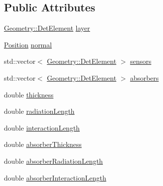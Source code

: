 \subsection*{Public Attributes}
\begin{DoxyCompactItemize}
\item 
\hyperlink{class_d_d4hep_1_1_geometry_1_1_det_element}{Geometry\+::\+Det\+Element} \hyperlink{struct_d_d4hep_1_1_d_d_rec_1_1_layering_extension_impl_1_1_layer_attributes_af0bbd3d9f7b9b1297b6cc79deaf05147}{layer}
\item 
\hyperlink{class_d_d4hep_1_1_d_d_rec_1_1_layering_extension_impl_a34281f7585bbe0d61654c9924e2789e3}{Position} \hyperlink{struct_d_d4hep_1_1_d_d_rec_1_1_layering_extension_impl_1_1_layer_attributes_a9920dfca99a6c4fc644a03ad650d1ffb}{normal}
\item 
std\+::vector$<$ \hyperlink{class_d_d4hep_1_1_geometry_1_1_det_element}{Geometry\+::\+Det\+Element} $>$ \hyperlink{struct_d_d4hep_1_1_d_d_rec_1_1_layering_extension_impl_1_1_layer_attributes_ae2f7cbcf5fd427fc4655bf769003909a}{sensors}
\item 
std\+::vector$<$ \hyperlink{class_d_d4hep_1_1_geometry_1_1_det_element}{Geometry\+::\+Det\+Element} $>$ \hyperlink{struct_d_d4hep_1_1_d_d_rec_1_1_layering_extension_impl_1_1_layer_attributes_a36c95a802bff564fab44f6c0cfdfbda3}{absorbers}
\item 
double \hyperlink{struct_d_d4hep_1_1_d_d_rec_1_1_layering_extension_impl_1_1_layer_attributes_a5c913b79fd8fba9c943fc7b10097663b}{thickness}
\item 
double \hyperlink{struct_d_d4hep_1_1_d_d_rec_1_1_layering_extension_impl_1_1_layer_attributes_ac5d8747f913962efd864c527e5f58e5b}{radiation\+Length}
\item 
double \hyperlink{struct_d_d4hep_1_1_d_d_rec_1_1_layering_extension_impl_1_1_layer_attributes_a8be7b3707f08f24e5738568783a67f7e}{interaction\+Length}
\item 
double \hyperlink{struct_d_d4hep_1_1_d_d_rec_1_1_layering_extension_impl_1_1_layer_attributes_a82e4964fda149e1cf07f18048b13ac64}{absorber\+Thickness}
\item 
double \hyperlink{struct_d_d4hep_1_1_d_d_rec_1_1_layering_extension_impl_1_1_layer_attributes_ab8e487c7c57cf4ad23dc81eb85189d96}{absorber\+Radiation\+Length}
\item 
double \hyperlink{struct_d_d4hep_1_1_d_d_rec_1_1_layering_extension_impl_1_1_layer_attributes_a9c544a56690f13249e4cfb943fb9d11e}{absorber\+Interaction\+Length}
\item 

\end{DoxyCompactItemize}

